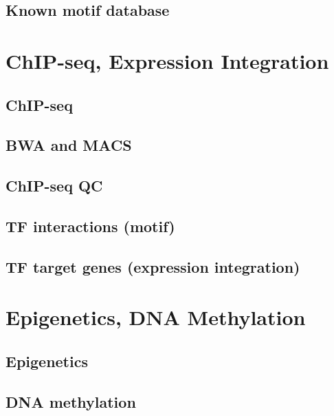 \documentclass[]{book}
\begin{document}
\hypertarget{known-motif-database}{%
\section{Known motif database}\label{known-motif-database}}

\hypertarget{chip}{%
\chapter{ChIP-seq, Expression Integration}\label{chip}}

\hypertarget{chip-seq}{%
\section{ChIP-seq}\label{chip-seq}}

\hypertarget{bwa-and-macs}{%
\section{BWA and MACS}\label{bwa-and-macs}}

\hypertarget{chip-seq-qc}{%
\section{ChIP-seq QC}\label{chip-seq-qc}}

\hypertarget{tf-interactions-motif}{%
\section{TF interactions (motif)}\label{tf-interactions-motif}}

\hypertarget{tf-target-genes-expression-integration}{%
\section{TF target genes (expression integration)}\label{tf-target-genes-expression-integration}}

\hypertarget{epi}{%
\chapter{Epigenetics, DNA Methylation}\label{epi}}

\hypertarget{epigenetics}{%
\section{Epigenetics}\label{epigenetics}}

\hypertarget{dna-methylation}{%
\section{DNA methylation}\label{dna-methylation}}
\end{document}
